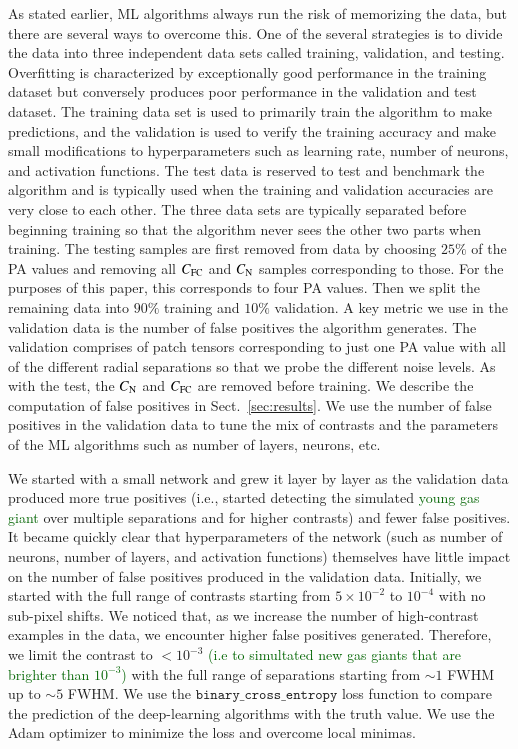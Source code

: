 \documentclass[referee]{aa} %
\newcommand{\newchange}[1]{\textcolor{darkgreen}{#1}}
\begin{document}
As stated earlier, ML algorithms always run the risk of memorizing the data, but there are several ways to overcome this.
One of the several strategies is to divide the data into three independent data sets called training, validation, and testing.
Overfitting is characterized by exceptionally good performance in the training dataset but conversely produces poor performance in the validation and test dataset.
The training data set is used to primarily train the algorithm to make predictions, and the validation is used to verify the training accuracy and make small modifications to hyperparameters such as learning rate, number of neurons, and activation functions. %
The test data is reserved to test and benchmark the algorithm and is typically used when the training and validation accuracies are very close to each other.
The three data sets are typically separated before beginning training so that the algorithm never sees the other two parts when training.
The testing samples are first removed from data by choosing $25\%$ of the PA values and removing all $C_{\rm FC}$ and $C_{\rm N}$ samples corresponding to those. 
For the purposes of this paper, this corresponds to four PA values.
Then we split the remaining data into $90\%$ training and $10\%$ validation.
A key metric we use in the validation data is the number of false positives the algorithm generates. 
The validation comprises of patch tensors corresponding to just one PA value with all of the different radial separations so that we probe the different noise levels.
As with the test, the $C_{\rm N}$ and $C_{\rm FC}$ are removed before training.
We describe the computation of false positives in Sect.~\ref{sec:results}.
We use the number of false positives in the validation data to tune the mix of contrasts and the parameters of the ML algorithms such as number of layers, neurons, etc.

We started with a small network and grew it layer by layer as the validation data produced more true positives (i.e., started detecting the simulated \newchange{young gas giant} over multiple separations and for higher contrasts) and fewer false positives.
It became quickly clear that hyperparameters of the network (such as number of neurons, number of layers, and activation functions) themselves have little impact on the number of false positives produced in the validation data.
Initially, we started with the full range of contrasts starting from $5\times10^{-2}$ to $10^{-4}$ with no sub-pixel shifts.
We noticed that, as we increase the number of high-contrast examples in the data, we encounter higher false positives generated. Therefore, we limit the contrast to $<10^{-3}$ \newchange{(i.e to simultated new gas giants that are brighter than $10^{-3}$)} with the full range of separations starting from $\sim 1$ FWHM up to $\sim 5$ FWHM.
We use the $\texttt{binary\_cross\_entropy}$ loss function \citep{1993Li} to compare the prediction of the deep-learning algorithms with the truth value.
We use the Adam optimizer \citep{2014Adam} to minimize the loss and overcome local minimas.
\end{document}
